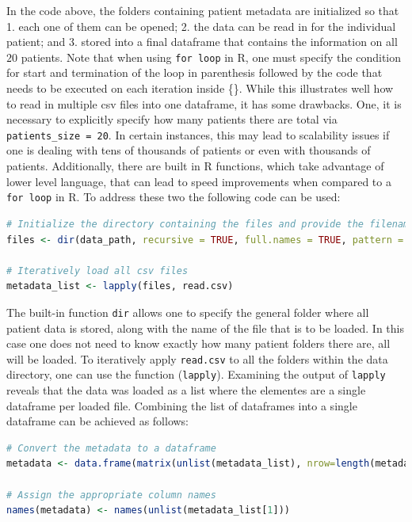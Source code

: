 In the code above, the folders containing patient metadata are initialized so that 1. each one of them can be opened; 2. the data can be read in for the individual patient; and 3. stored into a final dataframe that contains the information on all $20$ patients. Note that when using \verb|for loop| in R, one must specify the condition for start and termination of the loop in parenthesis followed by the code that needs to be executed on each iteration inside \{\}.
While this illustrates well how to read in multiple csv files into one dataframe, it has some drawbacks. One, it is necessary to explicitly specify how many patients there are total via \verb|patients_size = 20|. In certain instances, this may lead to scalability issues if one is dealing with tens of thousands of patients or even with thousands of patients. Additionally, there are built in R functions, which take advantage of lower level language, that can lead to speed improvements when compared to a \verb|for loop| in R.
To address these two the following code can be used:
\begin{lstlisting}[language=R]
# Initialize the directory containing the files and provide the filenames within each folder
files <- dir(data_path, recursive = TRUE, full.names = TRUE, pattern = "metadata.csv$")

# Iteratively load all csv files
metadata_list <- lapply(files, read.csv)
\end{lstlisting}
The built-in function \verb|dir| allows one to specify the general folder where all patient data is stored, along with the name of the file that is to be loaded. In this case one does not need to know exactly how many patient folders there are, all will be loaded. To iteratively apply \verb|read.csv| to all the folders within the data directory, one can use the function (\verb|lapply|).
Examining the output of \verb|lapply| reveals that the data was loaded as a list where the elementes are a single dataframe per loaded file. Combining the list of dataframes into a single dataframe can be achieved as follows:
\begin{lstlisting}[language=R]
# Convert the metadata to a dataframe
metadata <- data.frame(matrix(unlist(metadata_list), nrow=length(metadata_list), byrow=TRUE), stringsAsFactors=FALSE)

# Assign the appropriate column names
names(metadata) <- names(unlist(metadata_list[1]))
\end{lstlisting}

